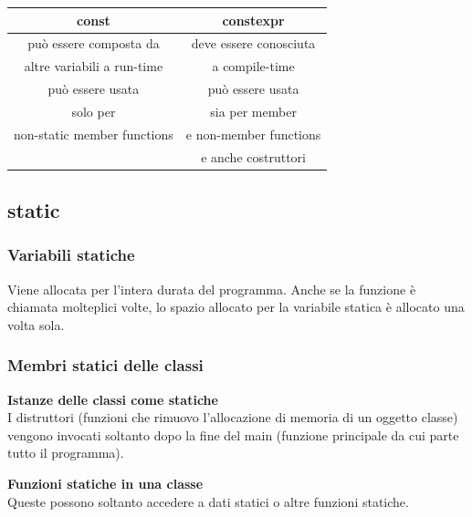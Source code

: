 \begin{tabular}{|c|c|}
	\hline
	\textbf{const} & \textbf{constexpr} \\
	\hline
	\textsf{\small può essere composta da } & \textsf{\small deve essere conosciuta } \\
	\textsf{\small altre variabili a run-time} & \textsf{\small a compile-time} \\
	\textsf{\small può essere usata  } & \textsf{\small può essere usata  } \\
	\textsf{\small solo per} & \textsf{\small sia per member} \\
	\textsf{\small non-static member functions} & \textsf{\small e non-member functions} \\
	\textsf{\small } & \textsf{\small e anche costruttori} \\
	\hline
\end{tabular}\break

\subsection{static}

\subsubsection{Variabili statiche}

\textsf{\small Viene allocata per l'intera durata del programma. Anche se la funzione è chiamata molteplici volte, lo spazio allocato per la variabile statica è allocato una volta sola.} \\

\subsubsection{Membri statici delle classi} %

\centering\textbf{Istanze delle classi come statiche} \\

\textsf{\small I distruttori (funzioni che rimuovo l'allocazione di memoria di un oggetto classe) vengono invocati soltanto dopo la fine del main (funzione principale da cui parte tutto il programma).} \break

\centering\textbf{Funzioni statiche in una classe} \\

\textsf{\small Queste possono soltanto accedere a dati statici o altre funzioni statiche.} \\


